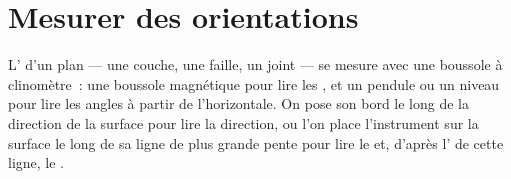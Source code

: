 \section{Mesurer des orientations}

L' d'un plan --- une couche, une faille, un joint --- se mesure avec une
boussole à clinomètre~: une boussole magnétique pour lire les , et un
pendule ou un niveau pour lire les angles à partir de l'horizontale. On pose son
bord le long de la direction de la surface pour lire la direction, ou l'on place
l'instrument sur la surface le long de sa ligne de plus grande pente pour lire le
 et, d'après l' de cette ligne, le .

